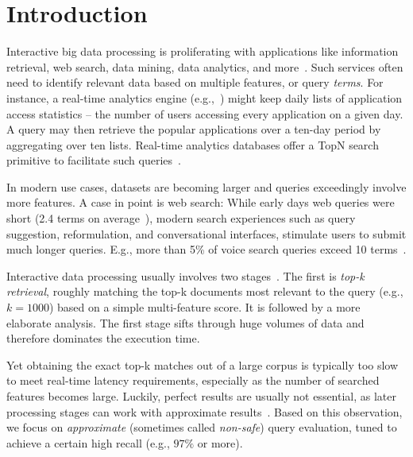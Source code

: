 \section{Introduction}
\label{sec:intro}

Interactive big data processing is proliferating with  applications like
information retrieval, web search, data mining, data analytics, and more~\cite{top-k-survey}. 
Such services often need to identify relevant data based on multiple {features}, or query \emph{terms}.  
For instance, a real-time analytics engine (e.g.,~\cite{flurry}) might keep daily lists of application access statistics -- the 
number of  users accessing every application on a given day.  
A query may then retrieve the popular applications over a  ten-day period by aggregating over ten lists.
Real-time analytics databases offer a TopN search primitive to facilitate such queries~\cite{druid-topN}.

In modern use cases, datasets are becoming larger and queries exceedingly involve more features. 
A case in point is web search:  
While  early days web queries were short (2.4 terms on average~\cite{Spink:2001:SWP:362968.362979}), 
modern search experiences such as query suggestion, reformulation, and conversational interfaces, stimulate  users to submit much longer queries. 
E.g., more than 5\% of voice search queries exceed 10 terms~\cite{sigir/Guy16}. 

Interactive data processing   usually involves two stages~\cite{Wang:2011}. 
The first  is \emph{top-k retrieval}, roughly matching the top-k documents most relevant to the query
(e.g., $k=1000$) based on a simple multi-feature  score. 
It is followed by a more elaborate analysis. 
The first stage  sifts through huge volumes of data and therefore dominates the execution time. 

Yet obtaining the exact top-k matches out of a large corpus is typically too slow to meet real-time latency requirements, 
especially as the number of searched features becomes large.
Luckily, 
perfect results are usually not essential, as later  processing 
stages can work with approximate results~\cite{Crane:2017,Lin:2015,Wang:2011,druid-topN}. 
Based on this observation, we focus on \emph{approximate} 
(sometimes called \emph{non-safe}) query evaluation, tuned to achieve a certain high recall (e.g., $97\%$ or more). 

